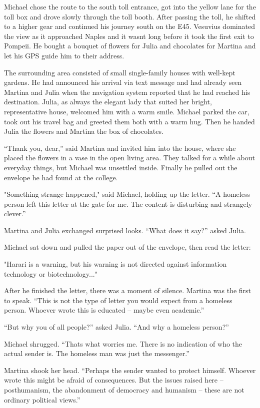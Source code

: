 \documentclass[
]{article}
\begin{document}
Michael chose the route to the south toll entrance, got into the yellow
lane for the toll box and drove slowly through the toll booth. After
passing the toll, he shifted to a higher gear and continued his journey
south on the E45. Vesuvius dominated the view as it approached Naples
and it wasn\textquotesingle t long before it took the first exit to
Pompeii. He bought a bouquet of flowers for Julia and chocolates for
Martina and let his GPS guide him to their address.

The surrounding area consisted of small single-family houses with
well-kept gardens. He had announced his arrival via text message and had
already seen Martina and Julia when the navigation system reported that
he had reached his destination. Julia, as always the elegant lady that
suited her bright, representative house, welcomed him with a warm smile.
Michael parked the car, took out his travel bag and greeted them both
with a warm hug. Then he handed Julia the flowers and Martina the box of
chocolates.

``Thank you, dear,'' said Martina and invited him into the house, where
she placed the flowers in a vase in the open living area. They talked
for a while about everyday things, but Michael was unsettled inside.
Finally he pulled out the envelope he had found at the college.

"Something strange happened," said Michael, holding up the letter. ``A
homeless person left this letter at the gate for me. The content is
disturbing and strangely clever.''

Martina and Julia exchanged surprised looks. ``What does it say?'' asked
Julia.

Michael sat down and pulled the paper out of the envelope, then read the
letter:

"Harari is a warning, but his warning is not directed against
information technology or biotechnology..."

After he finished the letter, there was a moment of silence. Martina was
the first to speak. ``This is not the type of letter you would expect
from a homeless person. Whoever wrote this is educated -- maybe even
academic.''

``But why you of all people?'' asked Julia. ``And why a homeless
person?''

Michael shrugged. ``That\textquotesingle s what worries me. There is no
indication of who the actual sender is. The homeless man was just the
messenger.''

Martina shook her head. ``Perhaps the sender wanted to protect himself.
Whoever wrote this might be afraid of consequences. But the issues
raised here -- posthumanism, the abandonment of democracy and humanism
-- these are not ordinary political views.''
\end{document}
